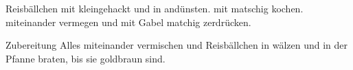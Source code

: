 \begin{recipe}{Reisbällchen}
	 mit
	 kleingehackt und in 
	 andünsten.
	 mit 
	 matschig kochen.
	 miteinander vermegen und mit Gabel matchig zerdrücken. 
	\item[Zubereitung] Alles miteinander vermischen und Reisbällchen in 
	 wälzen und in der Pfanne braten, bis sie goldbraun sind.
\end{recipe}
